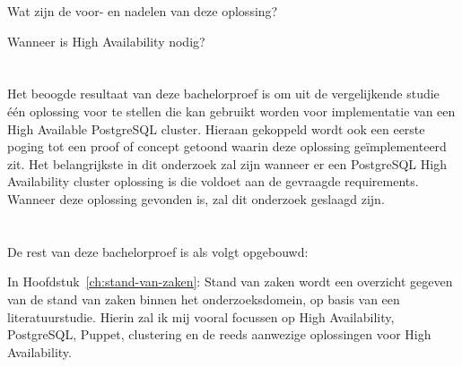  \begin{description}
    \item
    \item[$\cdot$] Wat zijn de voor- en nadelen van deze oplossing?
    \item[$\cdot$] Wanneer is High Availability nodig?
\end{description}


\section{}
\label{sec:onderzoeksdoelstelling}

Het beoogde resultaat van deze bachelorproef is om uit de vergelijkende studie één oplossing voor te stellen die kan gebruikt worden voor implementatie van een High Available PostgreSQL cluster. Hieraan gekoppeld wordt ook een eerste poging tot een proof of concept getoond waarin deze oplossing geïmplementeerd zit. Het belangrijkste in dit onderzoek zal zijn wanneer er een PostgreSQL High Availability cluster oplossing is die voldoet aan de gevraagde requirements. Wanneer deze oplossing gevonden is, zal dit onderzoek geslaagd zijn.


\section{}
\label{sec:opzet-bachelorproef}


De rest van deze bachelorproef is als volgt opgebouwd:

In Hoofdstuk~\ref{ch:stand-van-zaken}: Stand van zaken wordt een overzicht gegeven van de stand van zaken binnen het onderzoeksdomein, op basis van een literatuurstudie. Hierin zal ik mij vooral focussen op High Availability, PostgreSQL, Puppet, clustering en de reeds aanwezige oplossingen voor High Availability.

